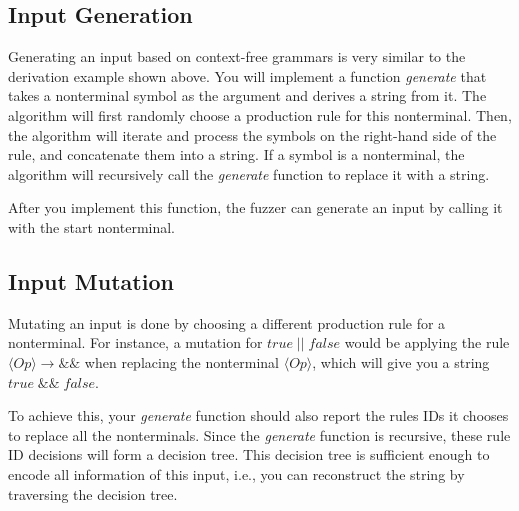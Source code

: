 \documentclass[letterpaper,11pt]{article}
\begin{document}

\subsection{Input Generation}

Generating an input based on context-free grammars is very similar to the derivation example shown above.
You will implement a function \textit{generate} that takes a nonterminal symbol as the argument and derives a string from it.
The algorithm will first randomly choose a production rule for this nonterminal.
Then, the algorithm will iterate and process the symbols on the right-hand side of the rule, and concatenate them into a string.
If a symbol is a nonterminal, the algorithm will recursively call the \textit{generate} function to replace it with a string.

After you implement this function, the fuzzer can generate an input by calling it with the start nonterminal.

\subsection{Input Mutation}
\label{sec:grammarmut}

Mutating an input is done by choosing a different production rule for a nonterminal.
For instance, a mutation for $true \; || \; false$ would be applying the rule $\langle Op \rangle  \rightarrow  \& \&$ when replacing the nonterminal $\langle Op \rangle$, which will give you a string $true \; \& \& \; false$.


To achieve this, your \textit{generate} function should also report the rules IDs it chooses to replace all the nonterminals.
Since the \textit{generate} function is recursive, these rule ID decisions will form a decision tree.
This decision tree is sufficient enough to encode all information of this input, i.e., you can reconstruct the string by traversing the decision tree.
\end{document}
